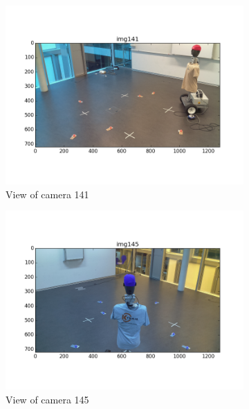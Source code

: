 \begin{figure}[H]
    \centering
    \begin{subfigure}{0.49\linewidth}
        \centering
        \includegraphics[width=\linewidth]{files/res1_img141.png}
        \caption{View of camera 141}
        \label{fig:res1_img}
    \end{subfigure}
    \begin{subfigure}{0.49\linewidth}
        \centering
        \includegraphics[width=\linewidth]{files/res1_img145.png}
        \caption{View of camera 145}
        \label{fig:res1_img145}
    \end{subfigure}
    \begin{subfigure}{0.7\linewidth}

\end{subfigure}
\end{figure}
